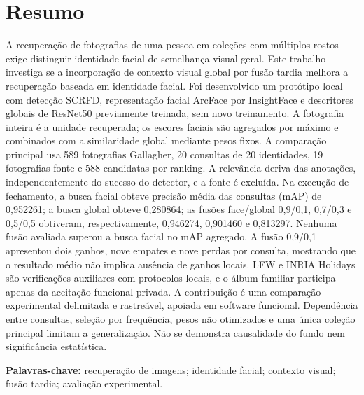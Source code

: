 \chapter*{Resumo}
\begin{singlespace}
A recuperação de fotografias de uma pessoa em coleções com múltiplos rostos exige distinguir identidade facial de semelhança visual geral. Este trabalho investiga se a incorporação de contexto visual global por fusão tardia melhora a recuperação baseada em identidade facial. Foi desenvolvido um protótipo local com detecção SCRFD, representação facial ArcFace por InsightFace e descritores globais de ResNet50 previamente treinada, sem novo treinamento. A fotografia inteira é a unidade recuperada; os escores faciais são agregados por máximo e combinados com a similaridade global mediante pesos fixos. A comparação principal usa 589 fotografias Gallagher, 20 consultas de 20 identidades, 19 fotografias-fonte e 588 candidatas por ranking. A relevância deriva das anotações, independentemente do sucesso do detector, e a fonte é excluída. Na execução de fechamento, a busca facial obteve precisão média das consultas (mAP) de 0,952261; a busca global obteve 0,280864; as fusões face/global 0,9/0,1, 0,7/0,3 e 0,5/0,5 obtiveram, respectivamente, 0,946274, 0,901460 e 0,813297. Nenhuma fusão avaliada superou a busca facial no mAP agregado. A fusão 0,9/0,1 apresentou dois ganhos, nove empates e nove perdas por consulta, mostrando que o resultado médio não implica ausência de ganhos locais. LFW e INRIA Holidays são verificações auxiliares com protocolos locais, e o álbum familiar participa apenas da aceitação funcional privada. A contribuição é uma comparação experimental delimitada e rastreável, apoiada em software funcional. Dependência entre consultas, seleção por frequência, pesos não otimizados e uma única coleção principal limitam a generalização. Não se demonstra causalidade do fundo nem significância estatística.
\par\medskip\noindent\textbf{Palavras-chave:} recuperação de imagens; identidade facial; contexto visual; fusão tardia; avaliação experimental.
\end{singlespace}
\clearpage
